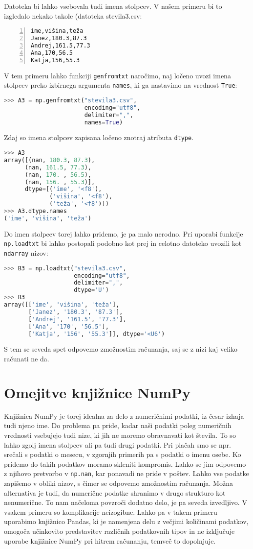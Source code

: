 Datoteka bi lahko vsebovala tudi imena stolpcev. V našem primeru bi to izgledalo nekako takole (datoteka {stevila3.csv}:
\begin{lstlisting}[numbers=left]
ime,višina,teža
Janez,180.3,87.3
Andrej,161.5,77.3
Ana,170,56.5
Katja,156,55.3
\end{lstlisting} 
V tem primeru lahko funkciji \texttt{genfromtxt} naročimo, naj ločeno uvozi imena stolpcev preko izbirnega argumenta \texttt{names}, ki ga nastavimo na vrednost \texttt{True}:
\begin{lstlisting}[language=Python]
>>> A3 = np.genfromtxt("stevila3.csv",
                       encoding="utf8",
                       delimiter=",", 
                       names=True)
\end{lstlisting}
Zdaj so imena stolpcev zapisana ločeno znotraj atributa \texttt{dtype}.
\begin{lstlisting}[language=Python]
>>> A3
array([(nan, 180.3, 87.3), 
      (nan, 161.5, 77.3), 
      (nan, 170. , 56.5),
      (nan, 156. , 55.3)],
      dtype=[('ime', '<f8'), 
             ('višina', '<f8'), 
             ('teža', '<f8')])
>>> A3.dtype.names
('ime', 'višina', 'teža')
\end{lstlisting}
Do imen stolpcev torej lahko pridemo, je pa malo nerodno. Pri uporabi funkcije \texttt{np.loadtxt} bi lahko postopali podobno kot prej in celotno datoteko uvozili kot \texttt{ndarray} nizov:
\begin{lstlisting}[language=Python]
>>> B3 = np.loadtxt("stevila3.csv", 
                    encoding="utf8", 
                    delimiter=",", 
                    dtype='U')
>>> B3
array([['ime', 'višina', 'teža'],
       ['Janez', '180.3', '87.3'],
       ['Andrej', '161.5', '77.3'],
       ['Ana', '170', '56.5'],
       ['Katja', '156', '55.3']], dtype='<U6')
\end{lstlisting}
S tem se seveda spet odpovemo zmožnostim računanja, saj se z nizi kaj veliko računati ne da. 

\section{Omejitve knjižnice NumPy}

Knjižnica NumPy je torej idealna za delo z numeričnimi podatki, iz česar izhaja tudi njeno ime. Do problema pa pride, kadar naši podatki poleg numeričnih vrednosti vsebujejo tudi nize, ki jih ne moremo obravnavati kot števila. To so lahko zgolj imena stolpcev ali pa tudi drugi podatki. Pri plačah smo se npr. srečali s podatki o mesecu, v zgornjih primerih pa s podatki o imenu osebe. Ko pridemo do takih podatkov moramo skleniti kompromis. Lahko se jim odpovemo z njihovo pretvorbo v \texttt{np.nan}, kar ponavadi ne pride v poštev. Lahko vse podatke zapišemo v obliki nizov, s čimer se odpovemo zmožnostim računanja. Možna alternativa je tudi, da numerične podatke shranimo v drugo strukturo kot nenumerične. To nam načeloma povzroči dodatno delo, je pa seveda izvedljivo. V vsakem primeru so komplikacije neizogibne. Lahko pa v takem primeru uporabimo knjižnico Pandas, ki je namenjena delu z večjimi količinami podatkov, omogoča učinkovito predstavitev različnih podatkovnih tipov in ne izključuje uporabe knjižnice NumPy pri hitrem računanju, temveč to dopolnjuje.
